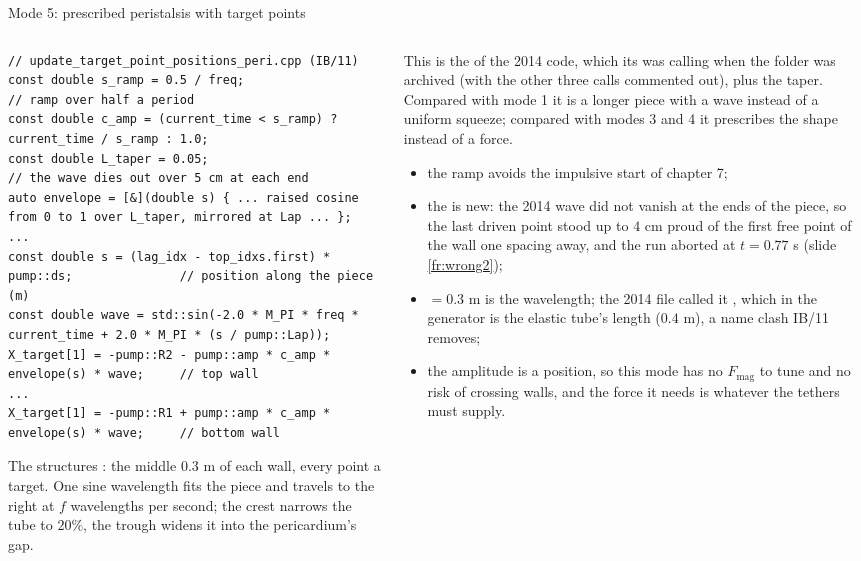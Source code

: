 \documentclass[aspectratio=169,11pt]{beamer}
\begin{document}
\begin{frame}[fragile]{Mode 5: prescribed peristalsis with target points}
\label{fr:targetperi}
\begin{columns}[T,onlytextwidth]
\begin{column}{0.52\textwidth}
\begin{lstlisting}[style=cpptiny]
// update_target_point_positions_peri.cpp (IB/11)
const double s_ramp = 0.5 / freq;                                     // ramp over half a period
const double c_amp = (current_time < s_ramp) ? current_time / s_ramp : 1.0;
const double L_taper = 0.05;                                          // the wave dies out over 5 cm at each end
auto envelope = [&](double s) { ... raised cosine from 0 to 1 over L_taper, mirrored at Lap ... };
...
const double s = (lag_idx - top_idxs.first) * pump::ds;               // position along the piece (m)
const double wave = std::sin(-2.0 * M_PI * freq * current_time + 2.0 * M_PI * (s / pump::Lap));
X_target[1] = -pump::R2 - pump::amp * c_amp * envelope(s) * wave;     // top wall
...
X_target[1] = -pump::R1 + pump::amp * c_amp * envelope(s) * wave;     // bottom wall
\end{lstlisting}
\scriptsize The structures : the middle $0.3$ m of each wall, every point a target. One sine wavelength fits the piece and travels to the right at $f$ wavelengths per second; the crest narrows the tube to $20\%$, the trough widens it into the pericardium's gap.
\end{column}
\begin{column}{0.46\textwidth}
\scriptsize This is the  of the 2014  code, which its  was calling when the folder was archived (with the other three calls commented out), plus the taper. Compared with mode 1 it is a longer piece with a wave instead of a uniform squeeze; compared with modes 3 and 4 it prescribes the shape instead of a force.
\begin{itemize}
  \item the ramp  avoids the impulsive start of chapter 7;
  \item the  is new: the 2014 wave did not vanish at the ends of the piece, so the last driven point stood up to $4$ cm proud of the first free point of the wall one spacing away, and the run aborted at $t = 0.77$ s (slide \ref{fr:wrong2});
  \item {} $= 0.3$ m is the wavelength; the 2014 file called it , which in the generator is the elastic tube's length ($0.4$ m), a name clash IB/11 removes;
  \item the amplitude is a position, so this mode has no $F_{\mathrm{mag}}$ to tune and no risk of crossing walls, and the force it needs is whatever the tethers must supply.
\end{itemize}
\end{column}
\end{columns}
\end{frame}
\end{document}

